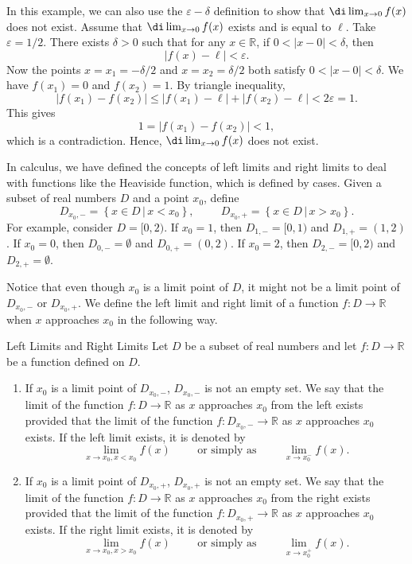  In this example, we can also use the $\varepsilon-\delta$ definition to show that  $\di\lim_{x\rightarrow  0}f(x)$ does not exist.  Assume that $\di\lim_{x\rightarrow  0}f(x)$ exists and is equal to $\ell$. Take $\varepsilon=1/2$. There exists $\delta>0$ such that for any $x\in \mathbb{R}$, if $0<|x-0|<\delta$, then
 \[|f(x)-\ell|<\varepsilon.\]Now the points $x=x_1=-\delta/2$ and $x=x_2=\delta/2$ both satisfy 
$0<|x-0|<\delta$. We have $f(x_1)=0$ and $f(x_2)=1$.
By triangle inequality,
\[|f(x_1)-f(x_2)|\leq |f(x_1)-\ell|+|f(x_2)-\ell|<2\varepsilon=1.\]
This gives
\[1=|f(x_1)-f(x_2)|<1,\]which is a contradiction. Hence, $\di\lim_{x\rightarrow 0}f(x)$ does not exist.
    

  
  In calculus, we have defined  the concepts of  left limits and right limits to deal with functions like the Heaviside function, which is defined by cases.
  Given a subset of real numbers $D$ and a point $x_0$, define
  \[D_{x_0, -}=\left\{x\in D\,|\,x< x_0\right\},\hspace{1cm} D_{x_0, +}=\left\{x\in D\,|\,x> x_0\right\}.\]
  For example, consider $D=[0, 2)$. If  $x_0=1$, then $D_{1,-}=[0,1)$ and $D_{1,+}=(1,2)$. If $x_0=0$, then $D_{0,-}=\emptyset$ and $D_{0,+}=(0,2)$. If $x_0=2$, then $D_{2,-}=[0,2)$ and $D_{2,+}=\emptyset$.
  
  Notice that even though $x_0$ is a limit point of $D$, it might not be a limit point of $D_{x_0,-}$ or $D_{x_0,+}$. 
  We define the left limit and right limit of a function $f:D\rightarrow\mathbb{R}$ when $x$ approaches $x_0$ in the following way.
  
  \begin{definition}{Left Limits and Right Limits}
   Let   $D$ be a subset of real numbers and let $f:D\rightarrow \mathbb{R}$ be a function defined on   $D$.  
   \begin{enumerate}[1.]
   \item If $x_0$ is a limit point of $D_{x_0,-}$, $D_{x_0,-}$ is not an empty set.  We say that the   limit of the function $f:D\rightarrow \mathbb{R}$ as $x$ approaches $x_0$ from the left exists provided that the limit of the function $f:D_{x_0,-}\rightarrow\mathbb{R}$ as $x$ approaches $x_0$ exists. If the left limit exists, it is denoted by
   \[\lim_{x\rightarrow x_0, x<x_0}f(x)\hspace{1cm}\text{or simply as}\hspace{1cm}\lim_{x\rightarrow x_0^-}f(x).\]
      \item If $x_0$ is a limit point of $D_{x_0,+}$, $D_{x_0,+}$ is not an empty set.  We say that the   limit of the function $f:D\rightarrow \mathbb{R}$ as $x$ approaches $x_0$ from the right exists provided that the limit of the function $f:D_{x_0,+}\rightarrow\mathbb{R}$ as $x$ approaches $x_0$ exists. If the right limit exists, it is denoted by
   \[\lim_{x\rightarrow x_0, x>x_0}f(x)\hspace{1cm}\text{or simply as}\hspace{1cm}\lim_{x\rightarrow x_0^+}f(x).\]
   \end{enumerate}
  
  \end{definition}
  
